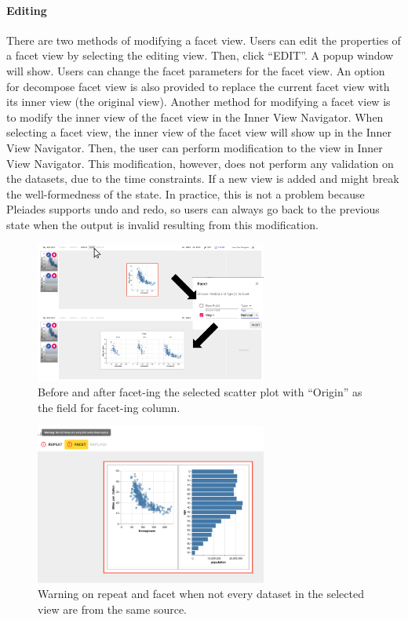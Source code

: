 \documentclass[journal]{vgtc}                %
\begin{document}
\paragraph{Editing} There are two methods of modifying a facet view. Users can
edit the properties of a facet view by selecting the editing view. Then, click
“EDIT”. A popup window will show. Users can change the facet parameters for the
facet view. An option for decompose facet view is also provided to replace the
current facet view with its inner view (the original view). Another method for
modifying a facet view is to modify the inner view of the facet view in the Inner
View Navigator. When selecting a facet view, the inner view of the facet view will
show up in the Inner View Navigator. Then, the user can perform modification to the
view in Inner View Navigator. This modification, however, does not perform any
validation on the datasets, due to the time constraints. If a new view is added
and might break the well-formedness of the state. In practice, this is not a problem
because Pleiades supports undo and redo, so users can always go back to the previous
state when the output is invalid resulting from this modification.

\begin{figure}[htb]
 \centering
 \includegraphics[width=3in]{facet.png}
 \caption{Before and after facet-ing the selected scatter plot with ``Origin'' as the field for facet-ing column.}
\end{figure}

\begin{figure}[htb]
 \centering
 \includegraphics[width=3in]{facet_warn.png}
 \caption{Warning on repeat and facet when not every dataset in the selected view are from the same source.}
\end{figure}
\end{document}
